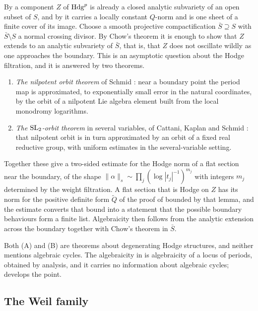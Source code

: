 By  a component $Z$ of $\mathrm{Hdg}^{p}$ is already a closed
analytic subvariety of an open subset of $S$, and by  it
carries a locally constant $Q$-norm and is one sheet of a finite cover of its
image. Choose a smooth projective compactification $\bar S\supseteq S$ with
$\bar S\setminus S$ a normal crossing divisor. By Chow's theorem it is enough
to show that $Z$ extends to an analytic subvariety of $\bar S$, that is, that
$Z$ does not oscillate wildly as one approaches the boundary. This is an
asymptotic question about the Hodge filtration, and it is answered by two
theorems.

\begin{enumerate}[label=\textup{(\Alph*)},leftmargin=2.2em]
\item \emph{The nilpotent orbit theorem} of Schmid \cite{Sch73}: near a
  boundary point the period map is approximated, to exponentially small error
  in the natural coordinates, by the orbit of a nilpotent Lie algebra element
  built from the local monodromy logarithms.
\item \emph{The $\operatorname{SL}_{2}$-orbit theorem} in several variables, of Cattani,
  Kaplan and Schmid \cite{CKS86}: that nilpotent orbit is in turn approximated
  by an orbit of a fixed real reductive group, with uniform estimates in the
  several-variable setting.
\end{enumerate}

Together these give a two-sided estimate for the Hodge norm of a flat section
near the boundary, of the shape $\|\alpha\|_{s}\sim\prod_{j}(\log|t_{j}|^{-1})^{m_{j}}$
with integers $m_{j}$ determined by the weight filtration. A flat section that
is Hodge on $Z$ has its norm for the positive definite form $\tilde Q$ of
the proof of  bounded by that lemma, and the
estimate converts that bound into a statement that the possible boundary
behaviours form a finite list. Algebraicity then follows from the analytic
extension across the boundary together with Chow's theorem in $\bar S$.

\begin{remark}\label{rem:cdkinputs}
Both (A) and (B) are theorems about degenerating Hodge structures, and
neither mentions algebraic cycles. The algebraicity in  is
algebraicity of a locus of periods, obtained by analysis, and it carries no
information about algebraic cycles;  develops the point.
\end{remark}

\subsection{The Weil family}

